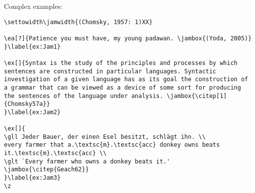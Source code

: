 \begin{frame}[fragile]

Complex examples:

\begin{lstlisting}
\settowidth\jamwidth{(Chomsky, 1957: 1)XX} 

\ea[?]{Patience you must have, my young padawan. \jambox{(Yoda, 2005)}
}\label{ex:Jam1}

\ex[]{Syntax is the study of the principles and processes by which sentences are constructed in particular languages. Syntactic investigation of a given language has as its goal the construction of a grammar that can be viewed as a device of some sort for producing the sentences of the language under analysis. \jambox{\citep[1]{Chomsky57a}}
}\label{ex:Jam2}	

\ex[]{
\gll Jeder Bauer, der einen Esel besitzt, schlägt ihn. \\ 
every farmer that a.\textsc{m}.\textsc{acc} donkey owns beats it.\textsc{m}.\textsc{acc} \\
\glt `Every farmer who owns a donkey beats it.' 
\jambox{\citep{Geach62}}
}\label{ex:Jam3}  
\z 

\end{lstlisting}

\end{frame}


\begin{frame}[fragile]

\settowidth{} 
\label{ex:Jam1}

\label{ex:Jam2}	

\label{ex:Jam3}  
\z 

\end{frame}

